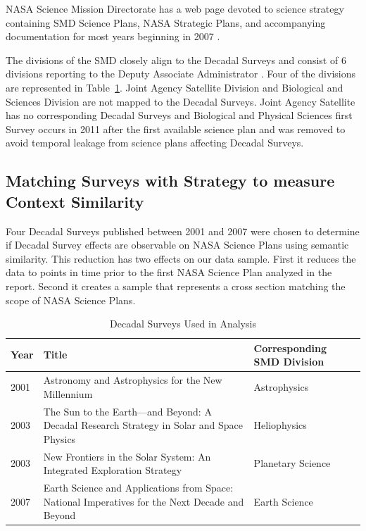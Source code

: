 \documentclass[preprint,12pt]{elsarticle}
\begin{document}
 NASA Science Mission Directorate has a web page devoted to science strategy containing SMD Science Plans, NASA Strategic Plans, and accompanying documentation for most years beginning in 2007 \cite{NASA_sci_strat}. 

 The divisions of the SMD closely align to the Decadal Surveys and consist of 6 divisions reporting to the Deputy Associate Administrator \cite{NASA_SMD}. Four of the divisions are represented in Table~\ref{tab:Decadals_used}. Joint Agency Satellite Division and Biological and Sciences Division are not mapped to the Decadal Surveys. Joint Agency Satellite has no corresponding Decadal Surveys and Biological and Physical Sciences first Survey occurs in 2011 after the first available science plan and was removed to avoid temporal leakage from science plans affecting Decadal Surveys.  

\subsection{Matching Surveys with Strategy to measure Context Similarity}
Four Decadal Surveys published between 2001 and 2007 were chosen to determine if Decadal Survey effects are observable on NASA Science Plans using semantic similarity.  This reduction has two effects on our data sample. First it reduces the data to points in time prior to the first NASA Science Plan analyzed in the report. Second it creates a sample that represents a cross section matching the scope of NASA Science Plans. 

\begin{table}[H]
\centering
\begin{tabular}{p{1.2cm} p{7.5cm} p{3.5cm}}
 \hline
 \rowcolor[gray]{0.95}
 \textbf{Year} & \textbf{Title} & \textbf{Corresponding SMD Division} \\ \hline
 2001 & Astronomy and Astrophysics for the New Millennium & Astrophysics \\
 \rowcolor[gray]{0.97}
 2003 & The Sun to the Earth—and Beyond: A Decadal Research Strategy in Solar and Space Physics & Heliophysics \\
 2003 & New Frontiers in the Solar System: An Integrated Exploration Strategy & Planetary  Science \\
 \rowcolor[gray]{0.97}
 2007 & Earth Science and Applications from Space: National Imperatives for the Next Decade and Beyond & Earth Science \\
\end{tabular}
\caption{Decadal Surveys Used in Analysis \cite{Academies_Decadal, NASA_sci_strat}}\label{tab:Decadals_used}
\end{table}
\end{document}
